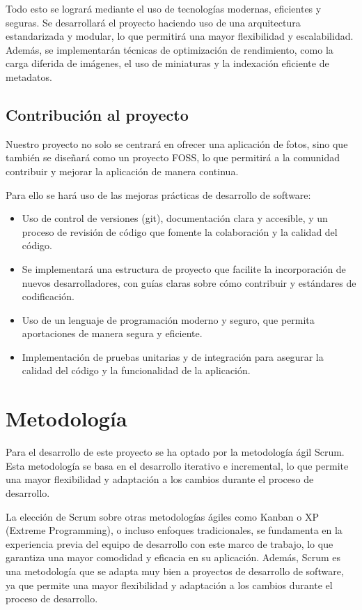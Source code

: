 Todo esto se logrará mediante el uso de tecnologías modernas, eficientes y seguras.
Se desarrollará el proyecto haciendo uso de una arquitectura estandarizada y modular, lo que permitirá una mayor flexibilidad y escalabilidad. Además, se implementarán técnicas de optimización de rendimiento, como la carga diferida de imágenes, el uso de miniaturas y la indexación eficiente de metadatos.
\subsection{Contribución al proyecto}
Nuestro proyecto no solo se centrará en ofrecer una aplicación de fotos, sino que también se diseñará como un proyecto FOSS, lo que permitirá a la comunidad contribuir y mejorar la aplicación de manera continua.

Para ello se hará uso de las mejoras prácticas de desarrollo de software:
\begin{itemize}
    \item Uso de control de versiones (\Gls{git}), documentación clara y accesible, y un proceso de revisión de código que fomente la colaboración y la calidad del código.
    \item Se implementará una estructura de proyecto que facilite la incorporación de nuevos desarrolladores, con guías claras sobre cómo contribuir y estándares de codificación.
    \item Uso de un lenguaje de programación moderno y seguro, que permita aportaciones de manera segura y eficiente.
    \item Implementación de pruebas unitarias y de integración para asegurar la calidad del código y la funcionalidad de la aplicación.
\end{itemize}

\section{Metodología}
\label{sec:metodologia}

Para el desarrollo de este proyecto se ha optado por la metodología ágil Scrum. Esta metodología se basa en el desarrollo iterativo e incremental, lo que permite una mayor flexibilidad y adaptación a los cambios durante el proceso de desarrollo.

La elección de Scrum sobre otras metodologías ágiles como Kanban o XP (Extreme Programming), o incluso enfoques tradicionales, se fundamenta en la experiencia previa del equipo de desarrollo con este marco de trabajo, lo que garantiza una mayor comodidad y eficacia en su aplicación.
Además, Scrum es una metodología que se adapta muy bien a proyectos de desarrollo de software, ya que permite una mayor flexibilidad y adaptación a los cambios durante el proceso de desarrollo.

